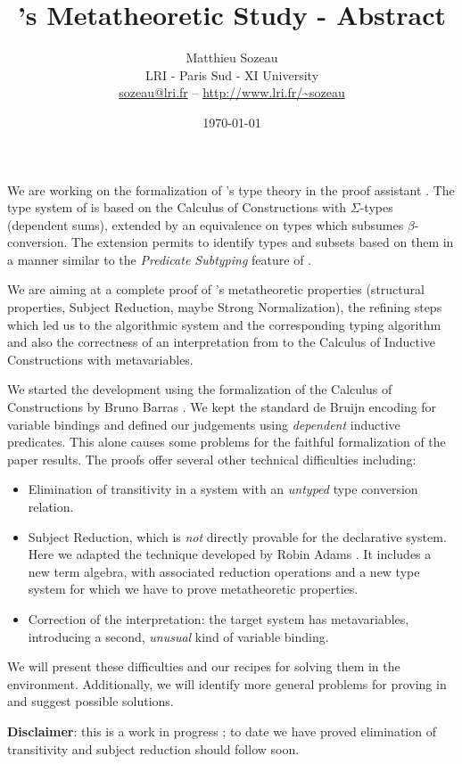 \documentclass{article}
\title{\Russell's Metatheoretic Study - Abstract}
\date{\today}
\author{Matthieu Sozeau \\
  LRI - Paris Sud - XI University \\
  \url{sozeau@lri.fr} -- \url{http://www.lri.fr/~sozeau}}
\begin{document}
\maketitle

We are working on the formalization of \Russell{}'s type theory in the
\Coq{} proof assistant \cite{sozeau:coq/Russell/meta}.  The type system
of \Russell{} is based on the Calculus of Constructions with
$\Sigma$-types (dependent sums), extended by an equivalence on types
which subsumes $\beta$-conversion. The extension permits to identify
types and subsets based on them in a manner similar to the
\emph{Predicate Subtyping} feature of \PVS{}.

We are aiming at a complete proof of \Russell{}'s metatheoretic properties
(structural properties, Subject Reduction, maybe Strong Normalization),
the refining steps which led us to the algorithmic system and the
corresponding typing algorithm and also the correctness of an interpretation
from \Russell{} to the Calculus of Inductive Constructions with
metavariables.

We started the development using the formalization of the Calculus of
Constructions by Bruno Barras \cite{Barras96a}.  We kept the standard de
Bruijn encoding for variable bindings and defined our judgements using
\emph{dependent} inductive predicates.  This alone causes some problems
for the faithful formalization of the paper results.  The proofs offer
several other technical difficulties including:
\begin{itemize}
\item Elimination of transitivity in a system with an \emph{untyped} type
  conversion relation.

\item Subject Reduction, which is \emph{not} directly provable for the
  declarative system. Here we adapted the technique developed by
  Robin Adams \cite{adams:PTSEQ}. It includes a new term algebra, with
  associated reduction operations and a new type system
  for which we have to prove metatheoretic properties.

\item Correction of the interpretation: the target system has
  metavariables, introducing a second, \emph{unusual} kind of variable
  binding.
\end{itemize}

We will present these difficulties and our recipes for solving them in
the \Coq environment. Additionally, we will identify more general problems for
proving in \Coq and suggest possible solutions. 

{\bf Disclaimer}: this is a work in
progress ; to date we have proved elimination of transitivity and
subject reduction should follow soon.




\end{document}
